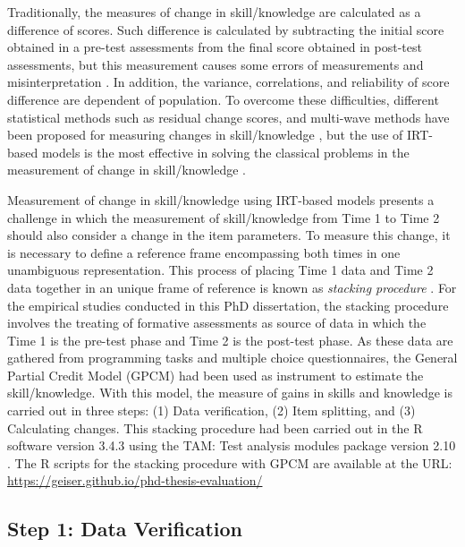 Traditionally, the measures of change in skill/knowledge are calculated as a difference of scores. Such difference is calculated by subtracting the initial score obtained in a pre-test assessments from the final score obtained in post-test assessments, but this measurement causes some errors of measurements and misinterpretation \cite{Lord1956, Lord1958}. In addition, the variance, correlations, and reliability of score difference are dependent of population. To overcome these difficulties, different statistical methods such as residual change scores, and multi-wave methods have been proposed for measuring changes in skill/knowledge \cite{DimitrovRumrill2003, RogosaWillett1985}, but the use of IRT-based models is the most effective in solving the classical problems in the measurement of change in skill/knowledge \cite{GluckSpiel1997, QueirozPrimiCarvalhoEnumo2013}.

Measurement of change in skill/knowledge using IRT-based models presents a challenge in which the measurement of skill/knowledge from Time 1 to Time 2 should also consider a change in the item parameters. To measure this change, it is necessary to define a reference frame encompassing both times in one unambiguous representation. This process of placing Time 1 data and Time 2 data together in an unique frame of reference is known as \emph{stacking procedure} \cite{Wright2003}. For the empirical studies conducted in this PhD dissertation, the stacking procedure involves the treating of formative assessments as source of data in which the Time 1 is the pre-test phase and Time 2 is the post-test phase. As these data are gathered from programming tasks and multiple choice questionnaires, the General Partial Credit Model (GPCM) \cite{MastersWright1996} had been used as instrument to estimate the skill/knowledge. With this model, the measure of gains in skills and knowledge is carried out in three steps: (1) Data verification, (2) Item splitting, and (3) Calculating changes. This stacking procedure had been carried out in the R software version 3.4.3 \cite{RCoreTeam2017} using the TAM: Test analysis modules package version 2.10 \cite{RobitzschKieferWu2018}. The R scripts for the stacking procedure with GPCM are available at the URL: \url{https://geiser.github.io/phd-thesis-evaluation/}

\subsection{Step 1: Data Verification}

